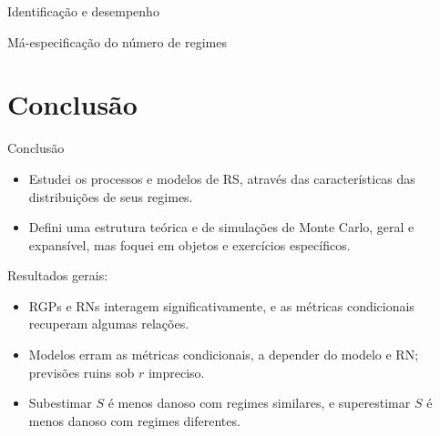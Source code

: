 \documentclass[
  ignorenonframetext,
  brazilian,
]{beamer}
\providecommand{\tightlist}{%
  \setlength{\itemsep}{0pt}\setlength{\parskip}{0pt}}\usepackage{longtable,booktabs,array}
\begin{document}
\begin{frame}{Identificação e desempenho}
\label{identificauxe7uxe3o-e-desempenho-1}
\begin{table}[!htbp]

\caption{\label{tbl-match_metrics}RMSE e identificação das métricas
condicionais}

\centering{

\vspace{-0.4cm}
\resizebox{\textwidth}{!}{%
}

}

\end{table}%
\end{frame}

\begin{frame}{Má-especificação do número de regimes}
\label{muxe1-especificauxe7uxe3o-do-nuxfamero-de-regimes}
\begin{table}[!htbp]

\caption{\label{tbl-regimes}Má especificação do número de regimes}

\centering{

\vspace{-0.3cm}
\resizebox{0.8\textwidth}{!}{%
}

}

\end{table}%
\end{frame}

\section{Conclusão}\label{conclusuxe3o}

\begin{frame}{Conclusão}
\label{conclusuxe3o-1}
\begin{itemize}
\item
  Estudei os processos e modelos de RS, através das características das
  distribuições de seus regimes.
\item
  Defini uma estrutura teórica e de simulações de Monte Carlo, geral e
  expansível, mas foquei em objetos e exercícios específicos.
\end{itemize}

\pause

Resultados gerais:

\begin{itemize}
\tightlist
\item
  RGPs e RNs interagem significativamente, e as métricas condicionais
  recuperam algumas relações.
\item
  Modelos erram as métricas condicionais, a depender do modelo e RN;
  previsões ruins sob \(r\) impreciso.
\item
  Subestimar \(S\) é menos danoso com regimes similares, e superestimar
  \(S\) é menos danoso com regimes diferentes.
\end{itemize}
\end{frame}
\end{document}
